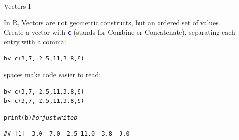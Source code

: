 \documentclass[xcolor=table,           xcolor=dvipsnames]{beamer}\usepackage[]{graphicx}\usepackage[]{color}
\makeatletter
\newcommand{\hlnum}[1]{\textcolor[rgb]{0,0,0}{#1}}
\newcommand{\hlcom}[1]{\textcolor[rgb]{0,0.392,0}{\textit{#1}}}
\newcommand{\hlopt}[1]{\textcolor[rgb]{0,0,0}{#1}}
\newcommand{\hlstd}[1]{\textcolor[rgb]{0,0,0}{#1}}
\newcommand{\hlkwb}[1]{\textcolor[rgb]{0,0,0}{#1}}
\newcommand{\hlkwd}[1]{\textcolor[rgb]{0,0,1}{#1}}
\newenvironment{kframe}{%
 \def\at@end@of@kframe{}%
 \ifinner\ifhmode%
  \def\at@end@of@kframe{\end{minipage}}%
  \begin{minipage}{\columnwidth}%
 \fi\fi%
 \def\FrameCommand##1{\hskip\@totalleftmargin \hskip-\fboxsep
 \colorbox{shadecolor}{##1}\hskip-\fboxsep
     \hskip-\linewidth \hskip-\@totalleftmargin \hskip\columnwidth}%
 \MakeFramed {\advance\hsize-\width
   \@totalleftmargin\z@ \linewidth\hsize
   \@setminipage}}%
 {\par\unskip\endMakeFramed%
 \at@end@of@kframe}
\newenvironment{knitrout}{}{} %
\newcommand{\rcode}[1]{\texttt{\textcolor{Blue}{#1}}} %
\makeatother
\begin{document}
\begin{frame}[fragile]{Vectors I}

In R, Vectors are not geometric constructs, but an ordered set of values.\\
\onslide<+->
Create a vector with \rcode{c} (stands for Combine or Concatenate), separating each entry with a comma:
\onslide<+->
\begin{knitrout}
\color{fgcolor}\begin{kframe}
\begin{alltt}
\hlstd{b} \hlkwb{<-} \hlkwd{c}\hlstd{(}\hlnum{3}\hlstd{,} \hlnum{7}\hlstd{,} \hlopt{-}\hlnum{2.5}\hlstd{,} \hlnum{11}\hlstd{,} \hlnum{3.8}\hlstd{,} \hlnum{9}\hlstd{)}
\end{alltt}
\end{kframe}
\end{knitrout}
\onslide<+->
spaces make code easier to read:
\begin{knitrout}
\color{fgcolor}\begin{kframe}
\begin{alltt}
\hlstd{b}\hlkwb{<-}\hlkwd{c}\hlstd{(}\hlnum{3}\hlstd{,}\hlnum{7}\hlstd{,}\hlopt{-}\hlnum{2.5}\hlstd{,}\hlnum{11}\hlstd{,}\hlnum{3.8}\hlstd{,}\hlnum{9}\hlstd{)}
\hlstd{b} \hlkwb{<-} \hlkwd{c}\hlstd{(}\hlnum{3}\hlstd{,} \hlnum{7}\hlstd{,} \hlopt{-}\hlnum{2.5}\hlstd{,} \hlnum{11}\hlstd{,} \hlnum{3.8}\hlstd{,} \hlnum{9}\hlstd{)}
\end{alltt}
\end{kframe}
\end{knitrout}
\onslide<+->
\begin{knitrout}
\color{fgcolor}\begin{kframe}
\begin{alltt}
\hlkwd{print}\hlstd{(b)} \hlcom{# or just write   b}
\end{alltt}
\begin{verbatim}
## [1]  3.0  7.0 -2.5 11.0  3.8  9.0
\end{verbatim}
\end{kframe}
\end{knitrout}
\end{frame}

\end{document}
